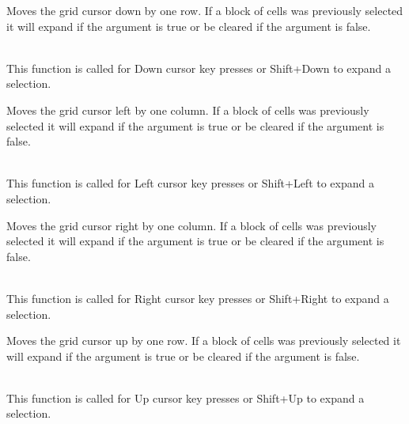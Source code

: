 \label{wxgridmovecursordown}


Moves the grid cursor down by one row. If a block of cells was previously selected it
will expand if the argument is true or be cleared if the argument is false.

\\
This function is called for Down cursor key presses or Shift+Down to expand a selection.



\label{wxgridmovecursorleft}


Moves the grid cursor left by one column. If a block of cells was previously selected it
will expand if the argument is true or be cleared if the argument is false.

\\
This function is called for Left cursor key presses or Shift+Left to expand a selection.



\label{wxgridmovecursorright}


Moves the grid cursor right by one column. If a block of cells was previously selected it
will expand if the argument is true or be cleared if the argument is false.

\\
This function is called for Right cursor key presses or Shift+Right to expand a selection.



\label{wxgridmovecursorup}


Moves the grid cursor up by one row. If a block of cells was previously selected it
will expand if the argument is true or be cleared if the argument is false.

\\
This function is called for Up cursor key presses or Shift+Up to expand a selection.



\label{wxgridmovecursordownblock}

